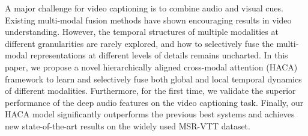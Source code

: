 A major challenge for video captioning is to combine audio and visual cues. Existing multi-modal fusion methods have shown encouraging results in video understanding. However, the temporal structures of multiple modalities at different granularities are rarely explored, and how to selectively fuse the multi-modal representations at different levels of details remains uncharted. In this paper, we propose a novel hierarchically aligned cross-modal attention (HACA) framework to learn and selectively fuse both global and local temporal dynamics of different modalities. Furthermore, for the first time, we validate the superior performance of the deep audio features on the video captioning task. Finally, our HACA model significantly outperforms the previous best systems and achieves new state-of-the-art results on the widely used MSR-VTT dataset.
